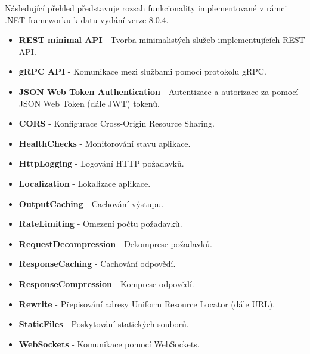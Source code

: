 
Následující přehled představuje rozsah funkcionality implementované v rámci .NET frameworku k datu vydání verze 8.0.4. \cite{aspnetdocs}

\begin{itemize}
    \item \textbf{REST minimal API} - Tvorba minimalistých služeb implementujících REST API.
    \item \textbf{gRPC API} - Komunikace mezi službami pomocí protokolu gRPC.
    \item \textbf{JSON Web Token Authentication} - Autentizace a autorizace za pomocí JSON Web Token (dále JWT) tokenů.
    \item \textbf{CORS} - Konfigurace Cross-Origin Resource Sharing.
    \item \textbf{HealthChecks} - Monitorování stavu aplikace.
    \item \textbf{HttpLogging} - Logování HTTP požadavků.
    \item \textbf{Localization} - Lokalizace aplikace.
    \item \textbf{OutputCaching} - Cachování výstupu.
    \item \textbf{RateLimiting} - Omezení počtu požadavků.
    \item \textbf{RequestDecompression} - Dekomprese požadavků.
    \item \textbf{ResponseCaching} - Cachování odpovědí.
    \item \textbf{ResponseCompression} - Komprese odpovědí.
    \item \textbf{Rewrite} - Přepisování adresy Uniform Resource Locator (dále URL).
    \item \textbf{StaticFiles} - Poskytování statických souborů.
    \item \textbf{WebSockets} - Komunikace pomocí WebSockets.
\end{itemize}
